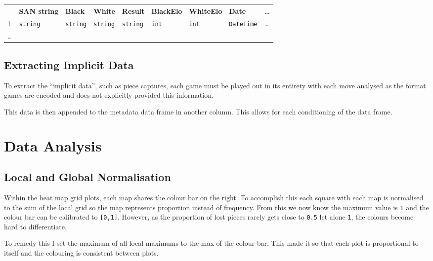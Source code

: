 \documentclass[11pt]{article}
\begin{document}
\begin{center}
\begin{tabular}{lllllllll}
 & SAN string & Black & White & Result & BlackElo & WhiteElo & Date & \ldots{}\\
\hline
1 & \texttt{string} & \texttt{string} & \texttt{string} & \texttt{string} & \texttt{int} & \texttt{int} & \texttt{DateTime} & \ldots{}\\
\ldots{} &  &  &  &  &  &  &  & \\
\end{tabular}
\end{center}

\subsection{Extracting Implicit Data}
\label{sec:orgbf80c9c}
To extract the ``implicit data'', such as piece captures, each game must be played out in its entirety with each move analysed as the format games are encoded and does not explicitly provided this information.

This data is then appended to the metadata data frame in another column. This allows for each conditioning of the data frame.
\section{Data Analysis}
\label{sec:org8db77bd}
\subsection{Local and Global Normalisation}
\label{sec:org66280c0}
Within the heat map grid plots, each map shares the colour bar on the right. To accomplish this each square with each map is normalised to the sum of the local grid so the map represents proportion instead of frequency. From this we now know the maximum value is \texttt{1} and the colour bar can be calibrated to \texttt{[0,1]}. However, as the proportion of lost pieces rarely gets close to \texttt{0.5} let alone \texttt{1}, the colours become hard to differentiate.

To remedy this I set the maximum of all local maximums to the max of the colour bar. This made it so that each plot is proportional to itself and the colouring is consistent between plots.
\end{document}
